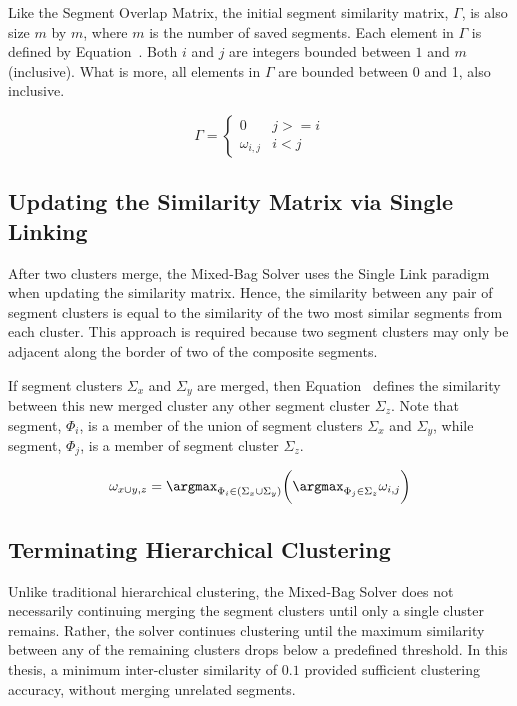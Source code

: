 Like the Segment Overlap Matrix, the initial segment similarity matrix, $\Gamma$, is also size $m$ by $m$, where $m$ is the number of saved segments.  Each element in $\Gamma$ is defined by Equation~.  Both $i$ and $j$ are integers bounded between $1$ and $m$ (inclusive).  What is more, all elements in $\Gamma$ are bounded between 0 and 1, also inclusive.

\begin{equation} \label{eq:similarityMatrix}
\Gamma = \begin{cases} 
	0 & j >= i
\\
	\omega_{i,j} & i < j
\end{cases} 
\end{equation}

\subsection{Updating the Similarity Matrix via Single Linking}

After two clusters merge, the Mixed-Bag Solver uses the Single Link paradigm when updating the similarity matrix.  Hence, the similarity between any pair of segment clusters is equal to the similarity of the two most similar segments from each cluster.  This approach is required because two segment clusters may only be adjacent along the border of two of the composite segments.  

If segment clusters $\Sigma_x$ and $\Sigma_y$ are merged, then Equation~ defines the similarity between this new merged cluster any other segment cluster $\Sigma_z$.  Note that segment, $\Phi_i$, is a member of the union of segment clusters $\Sigma_x$ and $\Sigma_y$, while segment, $\Phi_j$, is a member of segment cluster $\Sigma_z$.

\begin{equation} \label{eq:segmentClusterMerge}
	\omega_{x \cup y,z} = \argmax_{\Phi_i \in (\Sigma_x \cup \Sigma_y)} \bigg( \argmax_{\Phi_j \in \Sigma_z} \omega_{i,j} \bigg) 
\end{equation}

\subsection{Terminating Hierarchical Clustering}

Unlike traditional hierarchical clustering, the Mixed-Bag Solver does not necessarily continuing merging the segment clusters  until only a single cluster remains. Rather, the solver continues clustering until the maximum similarity between any of the remaining clusters drops below a predefined threshold.  In this thesis, a minimum inter-cluster similarity of $0.1$ provided sufficient clustering accuracy, without merging unrelated segments.

